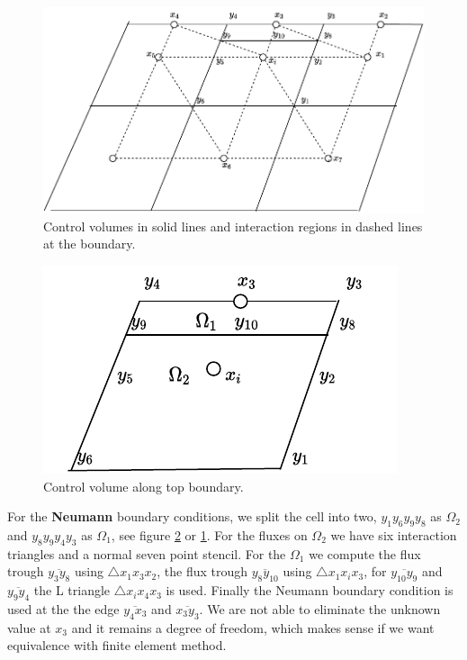 \documentclass[../Main/main.tex]{subfiles}
\begin{document}
	\begin{figure}[H]
		\centering
		\includegraphics{modified_L_scheme.pdf}
		\caption{Control volumes in solid lines and interaction regions in dashed lines at the boundary.}
		\label{fig:volemes along boundary}
	\end{figure}
	\begin{figure}[H]
		\centering
		\includegraphics{volumepartition.pdf}
		\caption{Control volume along top boundary.}
		\label{fig:volumepartition}
	\end{figure}
	For the \textbf{Neumann} boundary conditions, we split the cell into two, $y_1 y_6 y_9 y_8$ as $\Omega_2$ and $y_8 y_9 y_4 y_3$ as  $\Omega_1$, see figure \ref{fig:volumepartition} or \ref{fig:volemes along boundary}. For the fluxes on $\Omega_2$ we have six interaction triangles and a normal seven point stencil. For the $\Omega_1$ we compute the flux trough $\overline{y_3 y_8}$ using $\triangle x_1 x_3 x_2$, the flux trough $\overline{y_8 y_{10}}$ using $\triangle x_1 x_i x_3$, for $\overline{y_{10}y_9}$ and $\overline{y_9 y_4}$ the L triangle  $\triangle x_i x_4 x_3$ is used. Finally the Neumann boundary condition is used at the the edge $\overline{y_4 x_3}$ and $\overline{x_3 y_3}$. We are not able to eliminate the unknown value at $x_3$ and it remains a degree of freedom, which makes sense if we want equivalence with finite element method.
\end{document}
